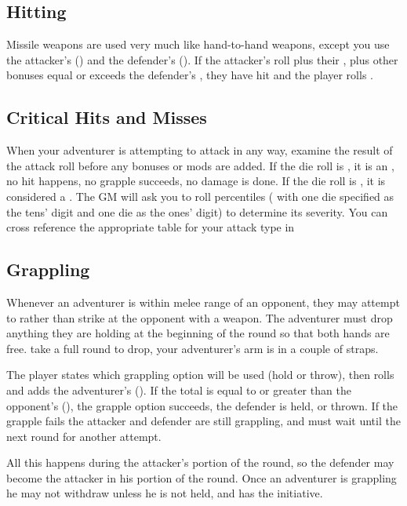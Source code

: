 \begin{multicols}{2}
\subsection{Hitting}
Missile weapons are used very much like hand-to-hand weapons, except you use the attacker's  (\MM) and the defender's  (\MDV). If the attacker's  roll plus their \MM, plus other bonuses equal or exceeds the defender's \MDV, they have hit and the player rolls .
\subsection{Critical Hits and Misses}
When your adventurer is attempting to attack in any way, examine the result of the attack roll before any bonuses or mods are added. If the die roll is , it is an , no hit happens, no grapple succeeds, no damage is
done. If the die roll is , it is considered a . The GM will ask you to roll percentiles ( with one die specified as the tens' digit and one die as the ones' digit) to determine its severity. You can cross reference the appropriate table for your attack type in 
\subsection{Grappling}
Whenever an adventurer is within melee range of an opponent, they may attempt to  rather than strike at the opponent with a weapon. The adventurer must drop anything they are holding at the beginning of the round so that both hands are free.  take a full round to drop, your adventurer's arm is in a couple of straps.

The player states which grappling option will be used (hold or throw), then rolls  and adds the adventurer's  (\GM). If the total is equal to or greater than the opponent's  (\GDV), the grapple option succeeds, the defender is held, or thrown. If the grapple fails the attacker and defender are still grappling, and must wait until the next round for another attempt.

All this happens during the attacker's portion of the round, so the defender may become the attacker in his portion of the round. Once an adventurer is grappling he may not withdraw unless he is not held, and has the initiative.

\end{multicols}
